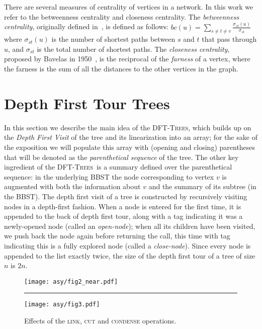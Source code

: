 \documentclass[a4paper,USenglish]{lipics}
\newcommand{\dfts}{\textsc{DFT-Trees}}
\begin{document}
There are several measures of centrality of vertices in a network. In this work we refer to the betweenness centrality and closeness centrality. The \emph{betweenness centrality}, originally defined in~\cite{freeman1977}, is defined as follows: $bc(u)=\sum_{s\neq t\neq v}\frac{\sigma_{st}(u)}{\sigma_{st}}$ where $\sigma_{st}(u)$ is the number of shortest paths between $s$ and $t$ that pass through $u$, and $\sigma_{st}$ is the total number of shortest paths.
The \emph{closeness centrality}, proposed by Bavelas in 1950~\cite{Bav50}, is the reciprocal of the \emph{farness} of a vertex, where the farness is the sum of all the distances to the other vertices in the graph. 



\section{Depth First Tour Trees}
\label{sec:dft}

In this section we describe the main idea of the \dfts, which builds up on the \emph{Depth First Visit} of the tree and its linearization into an array; for the sake of the exposition we will populate this array with (opening and closing) parentheses that will be denoted as the \emph{parenthetical sequence} of the tree. The other key ingredient of the \dfts\ is a summary defined over the parenthetical sequence: in the underlying BBST the  node corresponding to vertex $v$ is augmented with both the information about $v$ and the summary of its subtree (in the BBST).
The depth first visit of a tree is constructed by recursively visiting nodes in a depth-first fashion. When a node is entered for the first time, it is appended to the back of depth first tour, along with a tag indicating it was a newly-opened node (called an \emph{open-node}); when all its children have been visited, we push back the node again before returning the call, this time with tag indicating this is a fully explored node (called a \emph{close-node}). Since every node is appended to the list exactly twice, the size of the depth first tour of a tree of size $n$ is $2n$. 

\begin{figure}[t]
\centering
\texttt{[image: asy/fig2\_near.pdf]}\hfill{}\\[-4mm]
\textcolor{black!20!white}{\hrule}\vspace{4mm}
\texttt{[image: asy/fig3.pdf]}
\caption{Effects of the \textsc{link}, \textsc{cut} and \textsc{condense} operations.\label{fig:linkcut}}
\end{figure}
\end{document}
